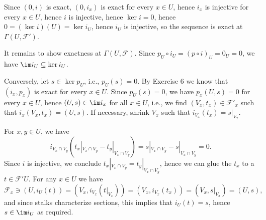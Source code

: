 Since $(0, i)$ is exact, $(0, i_x)$ is exact for every $x \in U$, hence
$i_x$ is injective for every $x \in U$, hence $i$ is injective, hence
$\ker i = 0$, hence $0 = (\ker i)(U) = \ker i_U$, hence $i_U$ is injective,
so the sequence is exact at $\Gamma(U, \mathcal{F}')$.

It remains to show exactness at $\Gamma(U, \mathcal{F})$. Since
$p_U \circ i_U = (p \circ i)_U = 0_U = 0$, we have
$\im i_U \subseteq \ker i_U$.

Conversely, let $s \in \ker p_U$, i.e., $p_U(s) = 0$. By Exercise 6 we know
that $(i_x, p_x)$ is exact for every $x \in U$. Since $p_U(s) = 0$, we have
$p_x(U, s) = 0$ for every $x \in U$, hence $(U, s) \in \im i_x$ for all $x \in U$,
i.e., we find $(V_x, t_x) \in \mathcal{F}'_x$ such that $i_x(V_x, t_x) = (U, s)$.
If necessary, shrink $V_x$ such that $i_{V_x}(t_x) = s|_{V_x}$.

For $x, y \in U$, we have
\[ i_{V_x\cap V_y}(t_x|_{V_x\cap V_y} - t_y|_{V_x\cap V_y}) = s|_{V_x\cap V_y} - s|_{V_x\cap V_y} = 0. \]
Since $i$ is injective, we conclude $t_x|_{V_x\cap V_y} = t_y|_{V_x\cap V_y}$, hence
we can glue the $t_x$ to a $t \in \mathcal{F}'U$. For any $x \in U$ we have
\[ \mathcal{F}_x\ni (U, i_U(t)) = (V_x, i_{V_x}(t|_{V_x})) = (V_x, i_{V_x}(t_x))
	= (V_x, s|_{V_x}) = (U, s), \]
and since stalks characterize sections, this implies that $i_U(t) = s$, hence
$s \in \im i_U$ as required.
